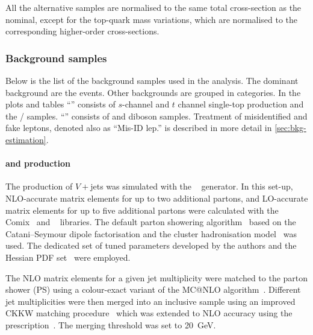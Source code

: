 All the alternative samples are normalised to the same total cross-section
as the nominal, except for the top-quark mass variations, which are normalised
to the corresponding higher-order cross-sections.


\subsubsection{Background samples}%
\label{sec:datamc:mc_background}

Below is the list of the background samples used in the analysis. The dominant
background are the \Wjets events. Other backgrounds are grouped in categories.
In the plots and tables ``\OtherT'' consists of \(s\)-channel and \(t\)
channel single-top production and the \ttV / \ttH samples.
``\OtherV''  consists of \Zjets and diboson samples.
Treatment of misidentified and fake leptons, denoted also as ``Mis-ID lep.''  %
is described in more detail in \cref{sec:bkg-estimation}.

\paragraph*{\Wjets and \Zjets production}

The production of \(V+\)jets was simulated with the \SHERPA[2.2.11]~\cite{Bothmann:2019yzt}
generator. In this set-up, NLO-accurate matrix elements for up to two additional partons,
and LO-accurate matrix elements for up
to five additional partons were calculated with the Comix~\cite{Gleisberg:2008fv} and
\OPENLOOPS~\cite{Buccioni:2019sur,Cascioli:2011va,Denner:2016kdg} libraries.
The default \SHERPA parton showering algorithm~\cite{Schumann:2007mg} based on
the Catani--Seymour dipole factorisation and the cluster hadronisation model~\cite{Winter:2003tt}  %
was used. The dedicated set of tuned parameters developed by the
\SHERPA authors and the Hessian \NNPDF[3.0nnlo] PDF set~\cite{Ball:2014uwa,Carrazza:2015aoa} were employed.

The NLO matrix elements for a given jet multiplicity were matched to the parton
shower (PS) using a colour-exact variant of the MC@NLO
algorithm~\cite{Hoeche:2011fd}. Different jet multiplicities were then merged
into an inclusive sample using an improved CKKW matching
procedure~\cite{Catani:2001cc,Hoeche:2009rj} which was extended to NLO
accuracy using the \MEPSatNLO prescription~\cite{Hoeche:2012yf}. The merging threshold
was set to \qty{20}{\GeV}.

